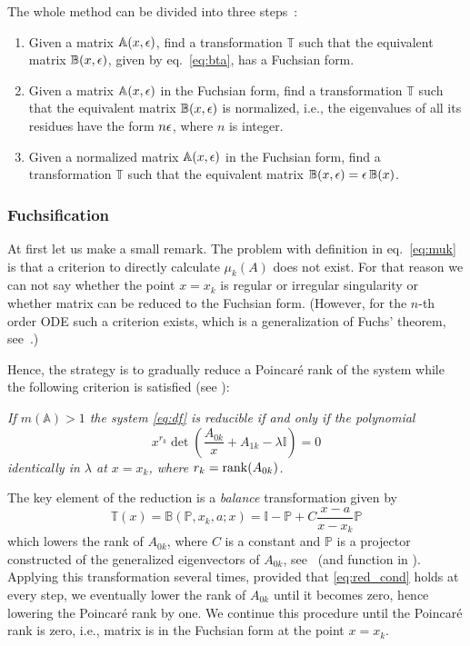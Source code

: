 \documentclass[12pt,a4paper]{article}
\def\M#1{\mathbb{#1}} %
\begin{document}
The whole method can be divided into three steps~\cite{Lee15}:
\begin{enumerate}
  \item Given a matrix $\M A(x,\eps)$, find a transformation $\M T$ such that the equivalent matrix $\M B(x,\eps)$, given by eq.~\eqref{eq:bta}, has a Fuchsian form.
  \item Given a matrix $\M A(x,\eps)$ in the Fuchsian form, find a transformation $\M T$ such that the equivalent matrix $\M B(x,\eps)$ is normalized, i.e., the eigenvalues of all its residues have the form $n \epsilon$, where $n$ is integer.
  \item Given a normalized matrix $\M A(x,\eps)$ in the Fuchsian form, find a transformation $\M T$ such that the equivalent matrix $\M B(x,\eps) = \eps \, \M B(x)$.
\end{enumerate}


\subsubsection{Fuchsification}

At first let us make a small remark.
The problem with definition in eq.~\eqref{eq:muk} is that a criterion to directly calculate $\mu_k(A)$ does not exist.
For that reason we can not say whether the point $x=x_k$ is regular or irregular singularity or whether matrix can be reduced to the Fuchsian form.
(However, for the $n$-th order ODE such a criterion exists, which is a generalization of Fuchs' theorem, see~\cite{Mos59}.)

Hence, the strategy is to gradually reduce a Poincar\'e rank of the system while the following criterion is satisfied (see \cite{Mos59}):

{\em If $m(\M A) > 1$ the system \eqref{eq:df} is reducible if and only if the polynomial}
\begin{equation}
\label{eq:red_cond}
  x^{r_k} \det\left(\frac{A_{0k}}{x} + A_{1k} - \lambda \M I\right) = 0
\end{equation}
{\em identically in $\lambda$ at $x=x_k$, where $r_k=\mathrm{rank}(A_{0k})$.}

The key element of the reduction is a {\em balance} transformation given by
\begin{equation}
  \M T(x) = \M B(\M P, x_k, a; x) = \M I - \M P + C \frac{x-a}{x-x_k} \M P
\end{equation}
which lowers the rank of $A_{0k}$, where $C$ is a constant and $\M P$ is a projector constructed of the generalized eigenvectors of $A_{0k}$, see~\cite[Section~3]{Lee15} (and  function in ).
Applying this transformation several times, provided that \eqref{eq:red_cond} holds at every step, we eventually lower the rank of $A_{0k}$ until it becomes zero, hence lowering the Poincar\'e rank by one.
We continue this procedure until the Poincar\'e rank is zero, i.e., matrix is in the Fuchsian form at the point $x=x_k$.
\end{document}

